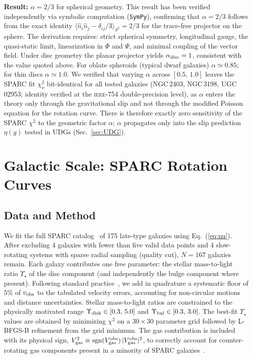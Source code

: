 \documentclass[aps,prd,twocolumn,showpacs,superscriptaddress]{revtex4-2}
\begin{document}
\textbf{Result:} $\alpha = 2/3$ for spherical geometry.
This result has been verified independently via symbolic
computation (\texttt{SymPy}), confirming that $\alpha = 2/3$
follows from the exact identity
$\langle \hat{n}_i\hat{n}_j - \delta_{ij}/3 \rangle_{S^2} = 2/3$
for the trace-free projector on the sphere.
The derivation requires: strict spherical symmetry,
longitudinal gauge, the quasi-static limit, linearization in
$\Phi$ and $\Psi$, and minimal coupling of the vector field.
Under disc geometry the planar projector yields
$\alpha_{\rm disc} = 1$, consistent with the value quoted above.
For oblate
spheroids (typical dwarf galaxies) $\alpha \simeq 0.85$; for thin
discs $\alpha \simeq 1.0$. We verified that varying $\alpha$ across
$[0.5,\,1.0]$ leaves the SPARC fit $\chi^2_\nu$ bit-identical for
all tested galaxies (NGC\,2403, NGC\,3198, UGC\,02953; identity
verified at the \textsc{ieee-754} double-precision level), as
$\alpha$ enters the theory only through the gravitational slip and
not through the modified Poisson equation for the rotation curve.
There is therefore exactly zero sensitivity of the SPARC $\chi^2$
to the geometric factor $\alpha$; $\alpha$ propagates only into the
slip prediction $\eta(g)$ tested in UDGs (Sec.~\ref{sec:UDG}).

\section{Galactic Scale: SPARC Rotation Curves}
\label{sec:sparc}

\subsection{Data and Method}

We fit the full SPARC catalog~\cite{Lelli2016} of 175 late-type
galaxies using Eq.~(\ref{eq:nu}).
After excluding 4 galaxies with fewer than five valid data points
and 4 slow-rotating systems with sparse radial sampling (quality cut),
$N=167$ galaxies remain.
Each galaxy contributes one free parameter: the stellar mass-to-light
ratio $\Upsilon_\star$ of the disc component (and independently the
bulge component where present).
Following standard practice~\cite{Li2018}, we add in quadrature a
systematic floor of $5\%$ of $v_{\rm obs}$ to the tabulated velocity
errors, accounting for non-circular motions and distance uncertainties.
Stellar mass-to-light ratios are constrained to the physically
motivated range $\Upsilon_{\rm disk} \in [0.3,\,5.0]$ and
$\Upsilon_{\rm bul} \in [0.3,\,3.0]$.
The best-fit $\Upsilon_\star$ values are obtained by minimizing
$\chi^2$ on a $30\times30$ parameter grid followed by L-BFGS-B
refinement from the grid minimum.
The gas contribution is included with its physical sign,
$V_{\rm gas}^2 \equiv {\rm sgn}(V_{\rm gas}^{\rm obs})\,
|V_{\rm gas}^{\rm obs}|^2$, to correctly account for
counter-rotating gas components present in a minority of SPARC
galaxies~\cite{Oman2015}.
\end{document}
